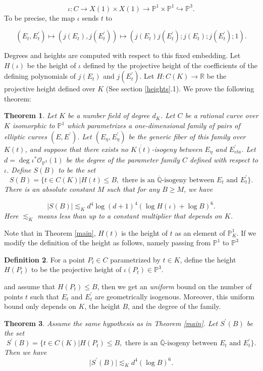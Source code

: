 \documentclass[12pt]{amsart}
\newtheorem{thm}{Theorem}[section]
\theoremstyle{definition}
\newtheorem{defn}[thm]{Definition}
\theoremstyle{remark}
\numberwithin{equation}{section}
\newcommand{\Q}{\mathbb{Q}}
\renewcommand{\P}{\mathbb{P}}
\begin{document}
\begin{equation}\label{iota}
	\iota: C \rightarrow X(1) \times X(1)  \rightarrow \mathbb{P}^{1} \times \mathbb{P}^{1} \hookrightarrow \mathbb{P}^{3}.
	\end{equation}
	To be precise, the map $\iota$ sends $t$ to 

$$(E_{t},E^{\prime}_{t}) \mapsto (j(E_{t}), j(E_{t}^{\prime})) \mapsto (j(E_{t})j(E_{t}^{\prime}); j(E_{t}); j(E_{t}^{\prime}); 1).$$

Degrees and heights are computed with respect to this fixed embedding.  Let $H(\iota)$ be the height of $\iota$ defined by the projective height of the coefficients of the defining polynomials of $j(E_{t})$ and $j(E_{t}^{\prime}).$ Let $H: C(K) \to  \mathbb{R} $ be the projective height defined over $K$ (See section \ref{heights}.1).
We prove the following theorem:
	

\begin{thm}\label{EC}\label{main}
Let $K$ be a number field of degree $d_K$. Let $C$ be a rational curve over $K$ isomorphic to $\mathbb{P}^{1}$ which parametrizes a one-dimensional family of pairs of elliptic curves $(E, E^{\prime})$. Let $(E_{\eta}, E^{\prime}_{\eta})$ be the generic fiber of this family over $K(t)$, and suppose that there exists no $\overline{K(t)}$-isogeny between $E_{\eta}$ and $E^{\prime}_{eta}$. Let $d=\operatorname{deg} \iota^{*}\mathcal{O}_{\mathbb{P}^3}(1)$ be the degree of the parameter family $C$ defined with respect to $\iota$. Define $S(B)$ to be the set 
$$S(B)=\{t \in C(K) \vert    H(t) \le B, \text{ there is an $\overline{\Q}$-isogeny between } E_{t}  \text{ and } E^{\prime}_{t}\}.$$  
There is an absolute constant $M$ such that for any $B \ge M$, we have 
	
	 $$\vert   S(B)\vert    \lesssim_{K} d^{4}\log(d+1)^4( \log H(\iota) + \log B)^{6}.$$ Here $\lesssim_K$ means less than up to a constant multiplier that depends on $K$.
\end{thm}

\vspace{1em}

	Note that in Theorem \ref{main}, $H(t)$ is the height of $t$ as an element of $\mathbb{P}^{1}_K$. If we modify the definition of the height as follows, namely passing from $\mathbb{P}^{1}$ to $\mathbb{P}^{3}$
    \begin{defn}\label{defniota}
	For a point $P_{t} \in C$ parametrized by $t \in K$, define the height $H(P_{t})$ to be the projective height of $\iota(P_{t}) \in \P^{3}$.\end{defn} 
    and assume that $H(P_t) \le  B$, then we get an \textit{uniform} bound on the number of points $t$ such that $E_t$ and $E^{\prime}_t$ are geometrically isogenous. Moreover, this uniform bound only depends on $K$, the height $B$, and the degree of the family.
	\begin{thm}\label{uniform version}
		Assume the same hypothesis as in Theorem \ref{main}. Let $S^{\prime}(B)$ be the set $$S^{\prime}(B)=\{t \in C(K) \vert    H(P_{t}) \le B, \text{ there is an $\overline{\Q}$-isogeny between } E_{t}  \text{ and } E^{\prime}_{t}\}.$$
		Then we have $$\vert   S^{\prime}(B)\vert  \lesssim_{K} d^{4}(\log B)^{6}.$$	
	\end{thm} 
\end{document}
